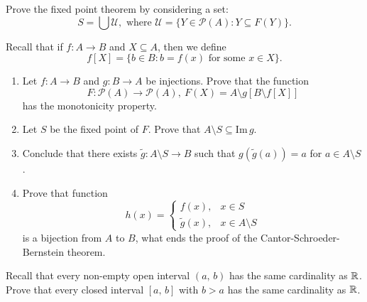 \begin{exercise}
  Prove the fixed point theorem by considering a set:
  	$$S=\bigcup \mathcal U, \text{~where~} \mathcal U = \{Y\in \mathcal P(A) : Y\subseteq F(Y)\}.$$
\end{exercise}

\begin{definition}
  Recall that if $f: A\to B$ and $X\subseteq A$, then we define
    $$f[X]=\{b\in B : b=f(x) \text{ for some } x\in X\}.$$
\end{definition}

\begin{exercise}
  \begin{enumerate}
    \item Let $f: A\to B$ and $g:B\to A$ be injections. Prove that the function
      $$F:\mathcal P(A)\to \mathcal P(A),~F(X)=A\setminus g[B\setminus f[X]]$$
      has the monotonicity property.

    \item Let $S$ be the fixed point of $F$. Prove that $A\setminus S\subseteq \text{Im}\,g$.
    \item Conclude that there exists $\tilde g: A\setminus S \to B$ such that $g(\tilde g(a))=a$ for $a\in A\setminus S$.
    \item Prove that function
      $$h(x) =
        \begin{cases}
          f(x), & x\in S\\
          \tilde g(x), & x \in A\setminus S
        \end{cases}
       $$
       is a bijection from $A$ to $B$, what ends the proof of the Cantor-Schroeder-Bernstein theorem.
  \end{enumerate}
\end{exercise}

\begin{exercise}
  Recall that every non-empty open interval $(a,\,b)$ has the same cardinality as $\mathbb R$. Prove that every closed interval $[a,\,b]$ with $b > a$ has the same cardinality as $\mathbb R$. 
\end{exercise}
